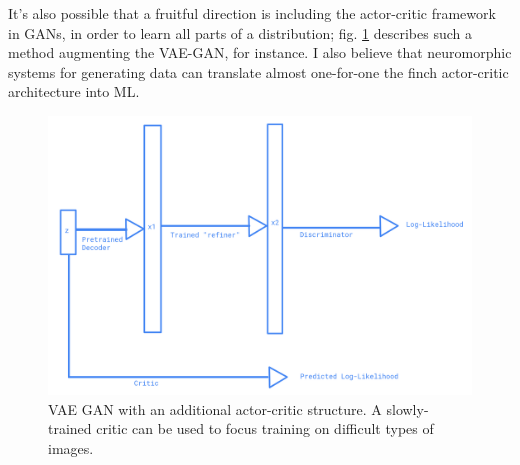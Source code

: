 \documentclass[aps,prl,preprint,groupedaddress]{revtex4-1}
\begin{document}
It's also possible that a fruitful direction is including the actor-critic framework in GANs, 
in order to learn all parts of a distribution;
fig. \ref{ActorCriticGAN} describes such a method augmenting the VAE-GAN, for instance. 
I also believe that neuromorphic systems for generating data can translate almost 
one-for-one the finch actor-critic architecture into ML.

\begin{figure}[h]
   \centering
   \includegraphics[width=1.0\textwidth]{jqfigs/ActorCriticGAN.png}
   \caption{\label{ActorCriticGAN} VAE GAN with an additional actor-critic structure. A slowly-trained critic can be used to focus training on difficult types of images.}
\end{figure}

\clearpage
{}

\clearpage
\widetext
\end{document}
